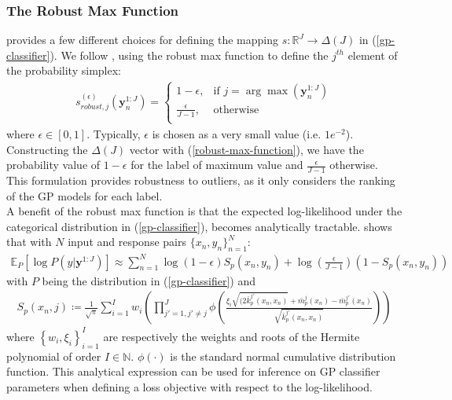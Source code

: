 \documentclass{article}
\numberwithin{equation}{section}
\begin{document}
\subsubsection{The Robust Max Function}
\cite{matthews2017scalable} provides a few different choices for defining the mapping $s: \mathbb{R}^J \rightarrow \Delta(J)$ in (\ref{gp-classifier}). We follow \cite{wild2022generalized}, using the robust max function to define the $j^{th}$ element of the probability simplex:
\begin{align}
s_{robust, j}^{(\epsilon)}\left(\mathbf{y}_n^{1:J}\right) = \begin{cases}
      1-\epsilon, &  \text{if } j = \arg \max\left(\mathbf{y}_n^{1:J}\right) \\
      \frac{\epsilon}{J-1}, & \text{otherwise} \\
   \end{cases}
   \label{robust-max-function}
\end{align}
where $\epsilon \in [0, 1]$. Typically, $\epsilon$ is chosen as a very small value (i.e. $1e^{-2}$). Constructing the $\Delta(J)$ vector with (\ref{robust-max-function}), we have the probability value of $1-\epsilon$ for the label of maximum value and $\frac{\epsilon}{J-1}$ otherwise. This formulation provides robustness to outliers, as it only considers the ranking of the GP models for each label.
\\A benefit of the robust max function is that the expected log-likelihood under the categorical distribution in (\ref{gp-classifier}), becomes analytically tractable. \cite{wild2022generalized} shows that with $N$ input and response pairs $\{x_n, y_n\}_{n=1}^N$:
\begin{align}
    \mathbb{E}_{P} \left[\log P\left(y \vert \mathbf{y}^{1:J}\right)\right] \approx \sum_{n=1}^N \log(1-\epsilon) S_p(x_n, y_n) + \log\left(\frac{\epsilon}{J-1}\right) \left(1-S_p(x_n, y_n)\right)
    \label{robust-max-function-expected-log-likelihood}
\end{align}
with $P$ being the distribution in (\ref{gp-classifier}) and 
\begin{align}
    S_p(x_n, j) \coloneqq \frac{1}{\sqrt{\pi}}\sum_{i=1}^{I} w_i \left(\prod_{j'=1, j'\neq j}^J \phi\left(\frac{\xi_i\sqrt{(2 \bar{k}^{j'}_p(x_n, x_n)}+\bar{m}^{j}_p(x_n) - \bar{m}^{j'}_p(x_n)}{\sqrt{\bar{k}^{j'}_p(x_n, x_n)}}\right)\right)
\end{align}
where $\left\{w_i, \xi_i\right\}_{i=1}^I$ are respectively the weights and roots of the Hermite polynomial of order $I \in \mathbb{N}$. $\phi(\cdot)$ is the standard normal cumulative distribution function. This analytical expression can be used for inference on GP classifier parameters when defining a loss objective with respect to the log-likelihood.
\end{document}
